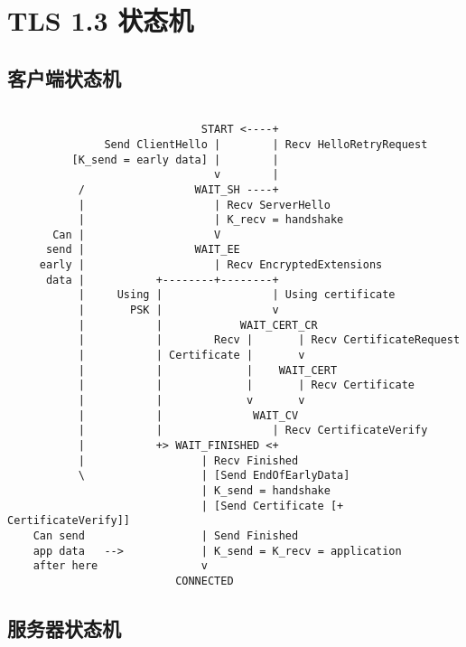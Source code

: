 \section{TLS 1.3 状态机}

\subsection{客户端状态机}

\begin{lstlisting}[language={},numbers=none,xleftmargin=2em,framexleftmargin=1.5em]

                              START <----+
               Send ClientHello |        | Recv HelloRetryRequest
          [K_send = early data] |        |
                                v        |
           /                 WAIT_SH ----+
           |                    | Recv ServerHello
           |                    | K_recv = handshake
       Can |                    V
      send |                 WAIT_EE
     early |                    | Recv EncryptedExtensions
      data |           +--------+--------+
           |     Using |                 | Using certificate
           |       PSK |                 v
           |           |            WAIT_CERT_CR
           |           |        Recv |       | Recv CertificateRequest
           |           | Certificate |       v
           |           |             |    WAIT_CERT
           |           |             |       | Recv Certificate
           |           |             v       v
           |           |              WAIT_CV
           |           |                 | Recv CertificateVerify
           |           +> WAIT_FINISHED <+
           |                  | Recv Finished
           \                  | [Send EndOfEarlyData]
                              | K_send = handshake
                              | [Send Certificate [+ CertificateVerify]]
    Can send                  | Send Finished
    app data   -->            | K_send = K_recv = application
    after here                v
                          CONNECTED
\end{lstlisting}

\newpage

\subsection{服务器状态机}

